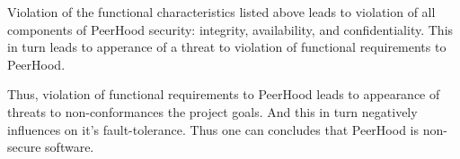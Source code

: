 %
Violation of the functional characteristics listed above leads to violation of all components of PeerHood security: integrity, availability, and confidentiality. 
%
This in turn leads to apperance of a threat to violation of functional requirements to PeerHood. 

%
Thus, violation of functional requirements to PeerHood leads to appearance of threats to non-conformances  the project goals. 
%
And this in turn negatively influences on it's fault-tolerance. 
%
Thus one can concludes that PeerHood is non-secure software. 